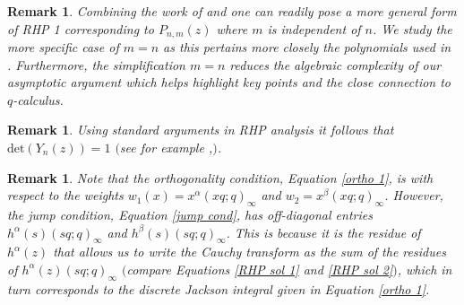 \documentclass[a4paper,reqno]{amsart}
\numberwithin{equation}{section}
\newtheorem{remark}[theorem]{Remark}
\numberwithin{figure}{section}
\begin{document}
\begin{remark}\label{could generalise remark}
    Combining the work of \cite[Section 5]{BK} and \cite{qRHP} one can readily pose a more general form of RHP 1 corresponding to $P_{n,m}(z)$ where $m$ is independent of $n$. We study the more specific case of $m=n$ as this pertains more closely the polynomials used in \cite{POSTELMANS2007119}. Furthermore, the simplification $m=n$ reduces the algebraic complexity of our asymptotic argument which helps highlight key points and the close connection to $q$-calculus. 
\end{remark}

\begin{remark}
    Using standard arguments in RHP analysis it follows that $\mathrm{det}(Y_n(z))=1$ $($see for example \cite{Deift1999strong},\cite{qRHP}$)$. 
\end{remark}

\begin{remark}
    Note that the orthogonality condition, Equation \eqref{ortho 1}, is with respect to the weights $w_1(x) = x^\alpha (xq;q)_\infty$ and $w_2 = x^\beta(xq;q)_\infty$. However, the jump condition, Equation \eqref{jump cond}, has off-diagonal entries $h^\alpha(s)(sq;q)_\infty$ and $h^\beta(s)(sq;q)_\infty$. This is because it is the residue of $h^{\alpha}(z)$ that allows us to write the Cauchy transform as the sum of the residues of $h^{\alpha}(z)(sq;q)_\infty$ $($compare Equations \eqref{RHP sol 1} and \eqref{RHP sol 2}$)$, which in turn corresponds to the discrete Jackson integral given in Equation \eqref{ortho 1}. 
\end{remark}
\end{document}
